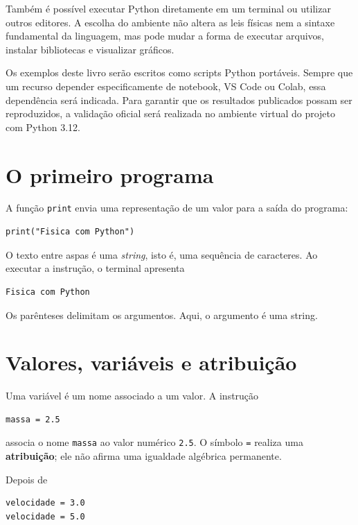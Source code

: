 Também é possível executar Python diretamente em um terminal ou utilizar outros editores. A escolha do ambiente não altera as leis físicas nem a sintaxe fundamental da linguagem, mas pode mudar a forma de executar arquivos, instalar bibliotecas e visualizar gráficos.

Os exemplos deste livro serão escritos como scripts Python portáveis. Sempre que um recurso depender especificamente de notebook, VS Code ou Colab, essa dependência será indicada. Para garantir que os resultados publicados possam ser reproduzidos, a validação oficial será realizada no ambiente virtual do projeto com Python 3.12.

\section{O primeiro programa}

A função \texttt{print} envia uma representação de um valor para a saída do programa:

\begin{lstlisting}
print("Fisica com Python")
\end{lstlisting}

O texto entre aspas é uma \emph{string}, isto é, uma sequência de caracteres. Ao executar a instrução, o terminal apresenta

\begin{lstlisting}[language={},numbers=none]
Fisica com Python
\end{lstlisting}

Os parênteses delimitam os argumentos. Aqui, o argumento é uma string.

\section{Valores, variáveis e atribuição}

Uma variável é um nome associado a um valor. A instrução

\begin{lstlisting}
massa = 2.5
\end{lstlisting}

associa o nome \texttt{massa} ao valor numérico \texttt{2.5}. O símbolo \texttt{=} realiza uma \textbf{atribuição}; ele não afirma uma igualdade algébrica permanente.

Depois de

\begin{lstlisting}
velocidade = 3.0
velocidade = 5.0
\end{lstlisting}

